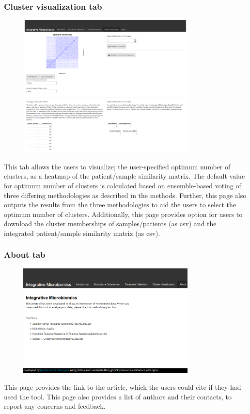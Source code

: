 \subsubsection{Cluster visualization tab}
\begin{figure}[H]
	\centering
\includegraphics[width=0.8\textwidth]{image/cluster_vis-tab.png}
\end{figure}
This tab allows the users to visualize; the user-specified optimum number of clusters, as a heatmap of the patient/sample similarity matrix. The default value for optimum number of clusters is calculated based on ensemble-based voting of three differing methodologies as described in the methods. Further, this page also outputs the results from the three methodologies to aid the users to  select the optimum number of clusters. Additionally, this page provides option for users to download the cluster memberships of samples/patients (as csv) and the integrated patient/sample similarity matrix (as csv).
\subsubsection{About tab}
\begin{figure}[H]
	\centering
\includegraphics[width=0.8\textwidth]{image/about-tab.png}
\end{figure}
This page provides the link to the article, which the users could cite if they had used the tool. This page also provides a list of authors and their contacts, to report any concerns and feedback.


